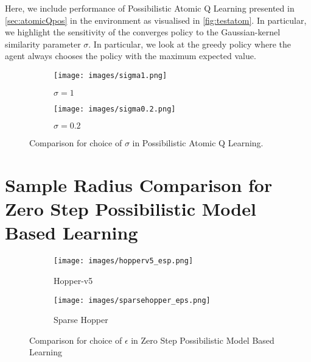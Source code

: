\documentclass[11pt,a4paper]{report}
\begin{document}
Here, we include performance of Possibilistic Atomic Q Learning presented in \ref{sec:atomicQpos} in the environment as visualised in \ref{fig:testatom}. In particular, we highlight the sensitivity of the converges policy to the Gaussian-kernel similarity parameter $\sigma$. In particular, we look at the greedy policy where the agent always chooses the policy with the maximum expected value. 


\begin{figure}[H]
  \centering
  \begin{subfigure}[b]{0.45\textwidth}
    \texttt{[image: images/sigma1.png]}
    \caption{$\sigma = 1$}
  \end{subfigure}
  \hfill
  \begin{subfigure}[b]{0.45\textwidth}
    \texttt{[image: images/sigma0.2.png]}
    \caption{$\sigma = 0.2$}
  \end{subfigure}
  \caption{Comparison for choice of $\sigma$ in Possibilistic Atomic Q Learning.}
\end{figure}
\newpage
\section*{Sample Radius Comparison for Zero Step Possibilistic Model Based Learning}\label{appendix:eps_cmp}

\begin{figure}[H]
  \centering
  \begin{subfigure}[b]{0.45\textwidth}
    \texttt{[image: images/hopperv5\_esp.png]}
    \caption{Hopper-v5}
  \end{subfigure}
  \hfill
  \begin{subfigure}[b]{0.45\textwidth}
    \texttt{[image: images/sparsehopper\_eps.png]}
    \caption{Sparse Hopper}
  \end{subfigure}
  \caption{Comparison for choice of $\epsilon$ in Zero Step Possibilistic Model Based Learning}
\end{figure}
\end{document}

